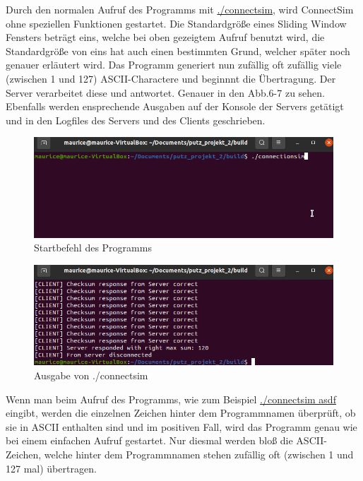 \documentclass{article}
\begin{document}
Durch den normalen Aufruf des Programms mit \underline{./connectsim}, wird ConnectSim ohne speziellen Funktionen gestartet. Die Standardgröße eines Sliding Window Fensters beträgt eins, welche bei oben gezeigtem Aufruf benutzt wird, die Standardgröße von eins hat auch einen bestimmten Grund, welcher später noch genauer erläutert wird. Das Programm generiert nun zufällig oft zufällig viele (zwischen 1 und 127) ASCII-Charactere und beginnnt die Übertragung. Der Server verarbeitet diese und antwortet. Genauer in den Abb.6-7 zu sehen. Ebenfalls werden ensprechende Ausgaben auf der Konsole der Servers getätigt und in den Logfiles des Servers und des Clients geschrieben.

\begin{center}
\begin{figure}[h]
    \centering
    \includegraphics[width=\textwidth]{connectsimclient.png}
    \caption{Startbefehl des Programms}
\end{figure}
\end{center}

\break

\begin{center}
\begin{figure}[h]
    \centering
    \includegraphics[width=\textwidth]{connectsimcliente.png}
    \caption{Ausgabe von ./connectsim}
\end{figure}
\end{center}

Wenn man beim Aufruf des Programms, wie zum Beispiel  \underline{./connectsim asdf} eingibt, werden die einzelnen Zeichen hinter dem Programmnamen überprüft, ob sie in ASCII enthalten sind und im positiven Fall, wird das Programm genau wie bei einem einfachen Aufruf gestartet. Nur diesmal werden bloß die ASCII-Zeichen, welche hinter dem Programmnamen stehen zufällig oft (zwischen 1 und 127 mal) übertragen.
\newline
\end{document}
